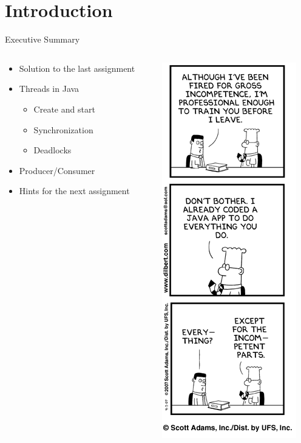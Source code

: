 \section*{Introduction}

\begin{frame}{Executive Summary}
  \begin{columns}[c]
    \begin{column}{0.6\textwidth}
      \begin{itemize}
      \item Solution to the last assignment
      \item Threads in Java
        \begin{itemize}
        \item Create and start
        \item Synchronization
        \item Deadlocks
        \end{itemize}
      \item Producer/Consumer
      \item Hints for the next assignment
      \end{itemize}
    \end{column}
    \begin{column}{0.4\textwidth}
      \begin{center}
        \includegraphics[scale=0.33]{figures/dilbert-1}    
      \end{center}
    \end{column}
  \end{columns}
\end{frame}


